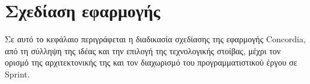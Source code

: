 \chapter{Σχεδίαση εφαρμογής}\label{chapter:3-application-design}

Σε αυτό το κεφάλαιο περιγράφεται η διαδικασία σχεδίασης της εφαρμογής Concordia, από τη σύλληψη της ιδέας και την επιλογή της τεχνολογικής στοίβας, μέχρι τον ορισμό της αρχιτεκτονικής της και τον διαχωρισμό του προγραμματιστικού έργου σε Sprint. 









